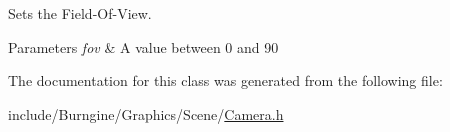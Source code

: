 Sets the Field-\/\-Of-\/\-View. 


\begin{DoxyParams}{Parameters}
{\em fov} & A value between 0 and 90 \\
\hline
\end{DoxyParams}


The documentation for this class was generated from the following file\-:\begin{DoxyCompactItemize}
\item 
include/\-Burngine/\-Graphics/\-Scene/\hyperlink{_camera_8h}{Camera.\-h}\end{DoxyCompactItemize}
